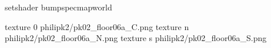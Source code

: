 setshader bumpspecmapworld

texture 0 philipk2/pk02_floor06a_C.png
texture n philipk2/pk02_floor06a_N.png
texture s philipk2/pk02_floor06a_S.png

